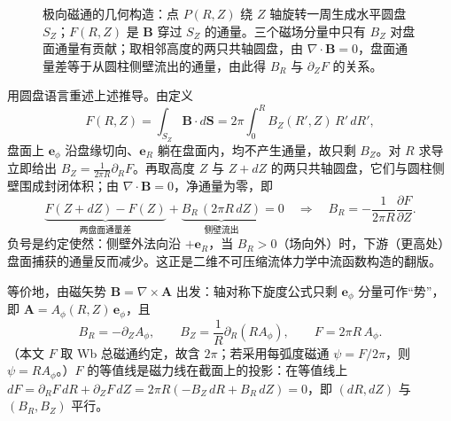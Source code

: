 \documentclass[12pt,fontset=none]{ctexart}
\numberwithin{equation}{section}
\numberwithin{table}{section}
\numberwithin{figure}{section}
\begin{document}
\begin{figure}[htbp]
\centering
{}
\caption{极向磁通的几何构造：点 $P(R,Z)$ 绕 $Z$ 轴旋转一周生成水平圆盘 $S_Z$；$F(R,Z)$ 是 $\bm{B}$ 穿过 $S_Z$ 的通量。三个磁场分量中只有 $B_Z$ 对盘面通量有贡献；取相邻高度的两只共轴圆盘，由 $\nabla\cdot\bm{B}=0$，盘面通量差等于从圆柱侧壁流出的通量，由此得 $B_R$ 与 $\partial_ZF$ 的关系。}
\label{fig:fluxdisk}
\end{figure}

用圆盘语言重述上述推导。由定义
\[
  F(R,Z)=\int_{S_Z}\bm{B}\cdot d\bm{S}=2\pi\int_0^R B_Z(R',Z)\,R'\,dR' ,
\]
盘面上 $\bm{e}_\phi$ 沿盘缘切向、$\bm{e}_R$ 躺在盘面内，均不产生通量，故只剩 $B_Z$。对 $R$ 求导立即给出 $B_Z=\frac{1}{2\pi R}\partial_RF$。再取高度 $Z$ 与 $Z+dZ$ 的两只共轴圆盘，它们与圆柱侧壁围成封闭体积；由 $\nabla\cdot\bm{B}=0$，净通量为零，即
\[
  \underbrace{F(Z+dZ)-F(Z)}_{\text{两盘面通量差}}+\underbrace{B_R\,(2\pi R\,dZ)}_{\text{侧壁流出}}=0
  \quad\Rightarrow\quad
  B_R=-\frac{1}{2\pi R}\frac{\partial F}{\partial Z}.
\]
负号是约定使然：侧壁外法向沿 $+\bm{e}_R$，当 $B_R>0$（场向外）时，下游（更高处）盘面捕获的通量反而减少。这正是二维不可压缩流体力学中流函数构造的翻版。

等价地，由磁矢势 $\bm{B}=\nabla\times\bm{A}$ 出发：轴对称下旋度公式只剩 $\bm{e}_\phi$ 分量可作``势''，即 $\bm{A}=A_\phi(R,Z)\,\bm{e}_\phi$，且
\[
  B_R=-\partial_ZA_\phi,\qquad B_Z=\frac{1}{R}\partial_R(RA_\phi),\qquad F=2\pi R\,A_\phi .
\]
（本文 $F$ 取 Wb 总磁通约定，故含 $2\pi$；若采用每弧度磁通 $\psi=F/2\pi$，则 $\psi=RA_\phi$。）$F$ 的等值线是磁力线在截面上的投影：在等值线上 $dF=\partial_RF\,dR+\partial_ZF\,dZ=2\pi R(-B_Z\,dR+B_R\,dZ)=0$，即 $(dR,dZ)$ 与 $(B_R,B_Z)$ 平行。
\end{document}
